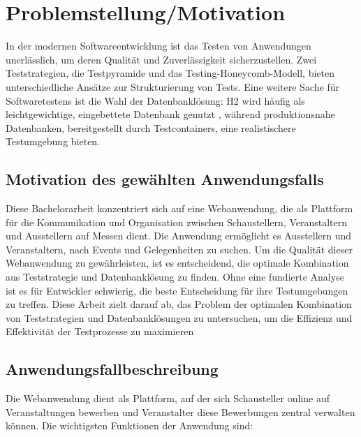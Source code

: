 \chapter{Problemstellung/Motivation}


In der modernen Softwareentwicklung ist das Testen von Anwendungen unerlässlich, um deren Qualität und Zuverlässigkeit sicherzustellen. Zwei  Teststrategien, die Testpyramide und das Testing-Honeycomb-Modell, bieten unterschiedliche Ansätze zur Strukturierung von Tests. Eine weitere Sache für Softwaretestens ist die Wahl der Datenbanklösung: H2 wird häufig als leichtgewichtige, eingebettete Datenbank genutzt , während produktionsnahe Datenbanken, bereitgestellt durch Testcontainers, eine realistischere Testumgebung bieten.

\section{Motivation des gewählten Anwendungsfalls}
Diese Bachelorarbeit konzentriert sich auf eine Webanwendung, die als Plattform für die Kommunikation und Organisation zwischen Schaustellern, Veranstaltern und Ausstellern auf Messen dient. Die Anwendung ermöglicht es Ausstellern und Veranstaltern, nach Events und Gelegenheiten zu suchen. Um die Qualität dieser Webanwendung zu gewährleisten, ist es entscheidend, die optimale Kombination aus Teststrategie und Datenbanklösung zu finden. Ohne eine fundierte Analyse ist es für Entwickler schwierig, die beste Entscheidung für ihre Testumgebungen zu treffen. Diese Arbeit zielt darauf ab, das Problem der optimalen Kombination von Teststrategien und Datenbanklösungen zu untersuchen, um die Effizienz und Effektivität der Testprozesse zu maximieren


\section{Anwendungsfallbeschreibung}
Die Webanwendung dient als Plattform, auf der sich Schausteller online auf Veranstaltungen bewerben und Veranstalter diese Bewerbungen zentral verwalten können. Die wichtigsten Funktionen der Anwendung sind:

